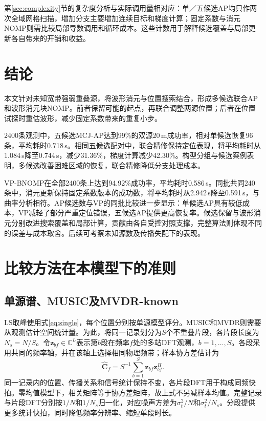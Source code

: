 \documentclass[a4paper,fleqn]{cas-sc}
\numberwithin{equation}{section}
\numberwithin{figure}{section}
\numberwithin{table}{section}
\newcommand{\C}{\mathbb C}
\begin{document}
第\ref{sec:complexity}节的复杂度分析与实际调用量相对应：单／五候选AP均只作两次全域网格扫描，增加分支主要增加连续目标和梯度计算；固定系数与消元NOMP则需比较局部导数调用和循环成本。这些计数用于解释候选覆盖与局部更新各自带来的开销和收益。


\FloatBarrier

\section{结论}\label{sec:conclusion}
本文针对未知宽带强弱重叠源，将波形消元与位置搜索结合，形成多候选联合AP和波形消元块NOMP。前者保留可能的起点，再联合调整两源位置；后者在位置试探时重估波形，减少固定系数带来的重复小步。

2400条观测中，五候选MCJ-AP达到99\%的双源20\,m成功率，相对单候选恢复96条，平均耗时0.718\,s。相同五候选配对中，联合精修保持定位表现，将平均耗时从1.084\,s降至0.744\,s，减少31.36\%，梯度计算减少42.30\%。构型分组与候选案例表明，多候选改善困难区域的恢复，联合精修降低分支处理成本。

VP-BNOMP在全部2400条上达到94.92\%成功率，平均耗时0.586\,s。同批共同240条中，消元更新保持固定系数版本的成功数，将平均耗时从2.942\,s降至0.591\,s，与曲率分析相符。AP候选数与VP的同批比较进一步显示：单候选AP具有较低成本，VP减轻了部分严重定位错误，五候选AP提供更高恢复率。候选保留与波形消元分别改进搜索覆盖和局部计算，贡献由各自受控对照支撑，完整算法则体现不同的误差与成本取舍。后续可考察未知源数及传播失配下的表现。


\FloatBarrier
\appendix

\section{比较方法在本模型下的准则}\label{app:baselines}
\subsection{单源谱、MUSIC及MVDR-known}
LS取峰使用式\eqref{eq:single}，每个位置分别按单源模型评分。MUSIC和MVDR则需要从观测估计空间统计量。为此，将同一记录划分为$S$个不重叠片段，各片段长度为$N_s=N/S$。令$\bm z_{bf}\in\C^L$表示第$b$段在频率$f$处的多站DFT观测，$b=1,\ldots,S$。各段采用共同的频率轴，并在该轴上选择相同物理频带；样本协方差估计为
\begin{equation}
 \widehat{\bm C}_f=S^{-1}\sum_{b=1}^S\bm z_{bf}\bm z_{bf}^H .
\end{equation}
同一记录内的位置、传播关系和信号统计保持不变，各片段DFT用于构成同频快拍。零均值模型下，相关矩阵等于协方差矩阵，故上式不另减样本均值。完整记录与片段DFT分别按$1/N$和$1/N_s$归一化，对应噪声方差为$\sigma_t^2/N$和$\sigma_t^2/N_s$。分段提供更多统计快拍，同时降低频率分辨率、缩短单段时长。
\end{document}
